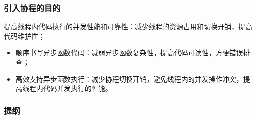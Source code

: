 \begin{frame}[fragile]
    \frametitle{引入协程的目的}

提高线程内代码执行的并发性能和可靠性：减少线程的资源占用和切换开销，提高代码维护性； \pause
    \begin{itemize}
        \item 顺序书写异步函数代码：减弱异步函数复杂性，提高代码可读性，方便错误排查； \pause
        \item 高效支持异步函数执行：减少协程切换开销，避免线程内的并发操作冲突，提高线程内代码并发执行的性能。
    \end{itemize}
\end{frame}
% 
\begin{frame}
\frametitle{提纲} %
\tableofcontents %
\end{frame}
